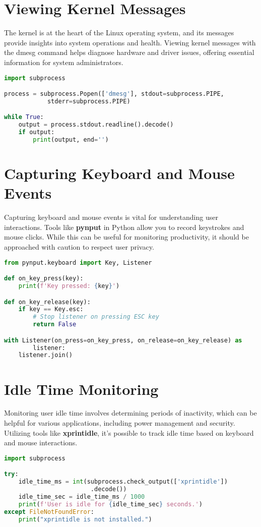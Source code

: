 \documentclass{VUMIFPSmagistrinis}
\begin{document}
\section{Viewing Kernel Messages}
The kernel is at the heart of the Linux operating system, and its messages provide insights into system operations and health. Viewing kernel messages with the dmesg command helps diagnose hardware and driver issues, offering essential information for system administrators.
\begin{lstlisting}[language=Python]
import subprocess

process = subprocess.Popen(['dmesg'], stdout=subprocess.PIPE, 
            stderr=subprocess.PIPE)

while True:
    output = process.stdout.readline().decode()
    if output:
        print(output, end='')
\end{lstlisting}

\section{Capturing Keyboard and Mouse Events}
Capturing keyboard and mouse events is vital for understanding user interactions. Tools like \textbf{pynput} in Python allow you to record keystrokes and mouse clicks. While this can be useful for monitoring productivity, it should be approached with caution to respect user privacy.

\begin{lstlisting}[language=Python]
from pynput.keyboard import Key, Listener

def on_key_press(key):
    print(f'Key pressed: {key}')

def on_key_release(key):
    if key == Key.esc:
        # Stop listener on pressing ESC key
        return False

with Listener(on_press=on_key_press, on_release=on_key_release) as 
        listener:
    listener.join()
\end{lstlisting}

\section{Idle Time Monitoring}
Monitoring user idle time involves determining periods of inactivity, which can be helpful for various applications, including power management and security. Utilizing tools like \textbf{xprintidle}, it's possible to track idle time based on keyboard and mouse interactions.

\begin{lstlisting}[language=Python]
import subprocess

try:
    idle_time_ms = int(subprocess.check_output(['xprintidle'])
                        .decode())
    idle_time_sec = idle_time_ms / 1000
    print(f'User is idle for {idle_time_sec} seconds.')
except FileNotFoundError:
    print("xprintidle is not installed.")
\end{lstlisting}
\end{document}
